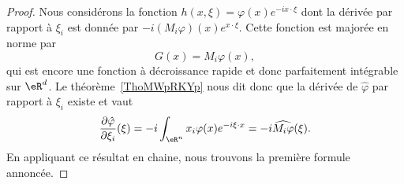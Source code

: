 \begin{proof}
	Nous considérons la fonction \( h(x,\xi)=\varphi(x) e^{-ix\cdot \xi}\) dont la dérivée par rapport à \( \xi_i\) est donnée par \( -i(M_{i}\varphi)(x) e^{x\cdot \xi}\). Cette fonction est majorée en norme par
	\begin{equation}
		G(x)=M_i\varphi(x),
	\end{equation}
	qui est encore une fonction à décroissance rapide et donc parfaitement intégrable sur \( \eR^d\). Le théorème~\ref{ThoMWpRKYp} nous dit donc que la dérivée de \( \hat \varphi\) par rapport à \( \xi_i\) existe et vaut
	\begin{equation}
		\frac{ \partial \hat\varphi }{ \partial \xi_i }(\xi)=-i\int_{\eR^n}x_i\varphi(x) e^{-i\xi\cdot x}=-i\widehat{M_i\varphi}(\xi).
	\end{equation}
	En appliquant ce résultat en chaine, nous trouvons la première formule annoncée.


\end{proof}
